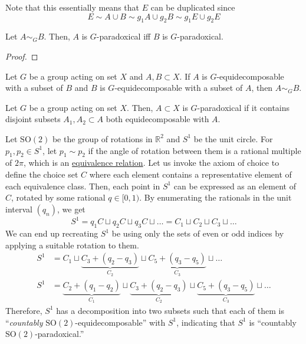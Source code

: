   Note that this essentially means that $E$ can be duplicated since 
  \begin{equation}
    E \sim A \cup B \sim g_1 A \cup g_2 B \sim g_1 E \cup g_2 E
  \end{equation}

  \begin{lemma}
    \label{thm:equi-paradox}
    Let $A \sim_G B$. Then, $A$ is $G$-paradoxical iff $B$ is $G$-paradoxical. 
  \end{lemma}
  \begin{proof}
    
  \end{proof}

  \begin{theorem}
    \label{thm:the-banach-schroder-bernstein-theorem}
    Let $G$ be a group acting on set $X$ and $A, B \subset X$. If $A$ is $G$-equidecomposable with a subset of $B$ and $B$ is $G$-equidecomposable with a subset of $A$, then $A \sim_G B$. 
  \end{theorem}

  \begin{corollary}
    \label{thm:disjoint-subset-paradoxical}
    Let $G$ be a group acting on set $X$. Then, $A \subset X$ is $G$-paradoxical if it contains disjoint subsets $A_1, A_2 \subset A$ both equidecomposable with $A$. 
  \end{corollary}

  \begin{example}
    \label{ex:vitali-paradox}
    Let $\mathrm{SO}(2)$ be the group of rotations in $\mathbb{R}^2$ and $S^1$ be the unit circle. For $p_1, p_2 \in S^1$, let $p_1 \sim p_2$ if the angle of rotation between them is a rational multiple of $2\pi$, which is an \hyperref[def:equivalence_relation]{equivalence relation}. Let us invoke the axiom of choice to define the choice set $C$ where each element contains a representative element of each equivalence class. Then, each point in $S^1$ can be expressed as an element of $C$, rotated by some rational $q \in [0, 1)$. By enumerating the rationals in the unit interval $(q_n)$, we get 
    \begin{equation}
      S^1 = q_1 C \sqcup q_2 C \sqcup q_3 C \sqcup \ldots = C_1 \sqcup C_2 \sqcup C_3 \sqcup \ldots
    \end{equation} 
    We can end up recreating $S^1$ be using only the sets of even or odd indices by applying a suitable rotation to them. 
    \begin{align}
      S^1 & = C_1 \sqcup \underbrace{C_3 + (q_2 - q_3)}_{C_2} \sqcup \underbrace{C_5 + (q_3 - q_5)}_{C_3} \sqcup \ldots \\ 
      S^1 & = \underbrace{C_2 + (q_1 - q_2)}_{C_1} \sqcup \underbrace{C_3 + (q_2 - q_3)}_{C_2} \sqcup \underbrace{C_5 + (q_3 - q_5)}_{C_3} \sqcup \ldots
    \end{align}
    Therefore, $S^1$ has a decomposition into two subsets such that each of them is ``\textit{countably} $\mathrm{SO}(2)$-equidecomposable'' with $S^1$, indicating that $S^1$ is ``countably $\mathrm{SO}(2)$-paradoxical.''
  \end{example}

